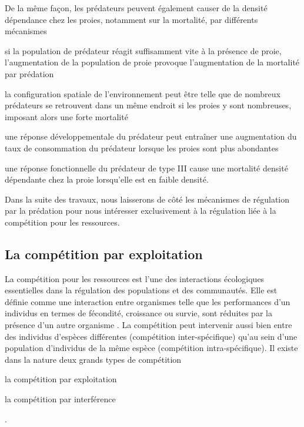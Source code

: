 De la même façon, les prédateurs peuvent également causer de la densité
dépendance chez les proies, notamment sur la mortalité, par différents
mécanismes \autocites{taylor1984a} \begin{enumerate*}[label=(\roman*),
before=\unskip{ : }, itemjoin={{ ; }}, itemjoin*={{ ; et }}] \item si la
population de prédateur réagit suffisamment vite à la présence de proie,
l'augmentation de la population de proie provoque l'augmentation de la mortalité
par prédation \item la configuration spatiale de l'environnement peut être telle
que de nombreux prédateurs se retrouvent dans un même endroit si les proies y
sont nombreuses, imposant alors une forte mortalité \item une réponse
développementale du prédateur peut entraîner une augmentation du taux de
consommation du prédateur lorsque les proies sont plus abondantes \item une
réponse fonctionnelle du prédateur de type III \autocites{holling1965a} cause
une mortalité densité dépendante chez la proie lorsqu'elle est en faible
densité.
\end{enumerate*}

Dans la suite des travaux, nous laisserons de côté les mécanismes de régulation
par la prédation pour nous intéresser exclusivement à la régulation liée à la
compétition pour les ressources. 

\subsection{La compétition par exploitation}

La compétition pour les ressources est l'une des interactions écologiques
essentielles dans la régulation des populations et des communautés. Elle est définie comme une
interaction entre organismes telle que les performances d'un individus en termes
de fécondité, croissance ou survie, sont réduites par la présence d'un autre
organisme \autocites{volterra1931a, gause1932a, park1948a, park1954a, park1957a}.
La compétition peut intervenir aussi bien entre des individus d'espèces
différentes (compétition inter-spécifique) qu'au sein d'une population
d'individus de la même espèce (compétition intra-spécifique). 
Il existe dans la nature deux grands types de compétition
\begin{enumerate*}[label=(\roman*), before=\unskip{ : }, itemjoin={{ ; }},
itemjoin*={{ ; et }}] \item la compétition par exploitation \item la compétition
par interférence \end{enumerate*} \autocites{park1954a, park1962a, begon2009a}.

